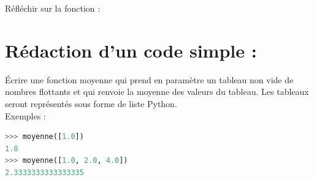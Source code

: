 \documentclass[a4paper, noanswers, addpoints, 12pt]{exam}
\begin{document}
\begin{questions}
\question[2] Réfléchir sur la fonction :
\section{Rédaction d'un code simple :}
\question[4] Écrire une fonction moyenne qui prend en paramètre un tableau non vide de nombres
flottants et qui renvoie la moyenne des valeurs du tableau. Les tableaux seront représentés sous forme de liste Python.\\
Exemples :
\begin{lstlisting}[language=Python]
>>> moyenne([1.0])
1.0
>>> moyenne([1.0, 2.0, 4.0])
2.3333333333333335
\end{lstlisting}



\end{questions}
\end{document}
